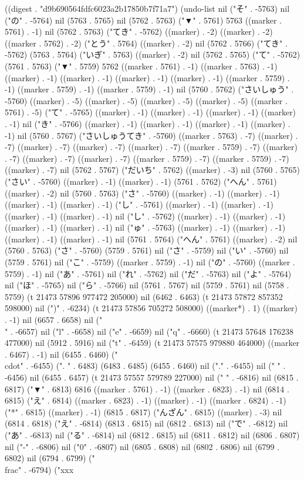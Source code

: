 
((digest . "d9b690564fdfc6023a2b17850b7f71a7") (undo-list nil ("そ" . -5763) nil ("の" . -5764) nil (5763 . 5765) nil (5762 . 5763) ("▼" . 5761) 5763 ((marker . 5761) . -1) nil (5762 . 5763) ("てき" . -5762) ((marker) . -2) ((marker) . -2) ((marker . 5762) . -2) ("とう" . 5764) ((marker) . -2) nil (5762 . 5766) ("てき" . -5762) (5763 . 5764) ("いぎ" . 5763) ((marker) . -2) nil (5762 . 5765) ("て" . -5762) (5761 . 5763) ("▼" . 5759) 5762 ((marker . 5761) . -1) ((marker . 5763) . -1) ((marker) . -1) ((marker) . -1) ((marker) . -1) ((marker) . -1) ((marker . 5759) . -1) ((marker . 5759) . -1) ((marker . 5759) . -1) nil (5760 . 5762) ("さいしゅう" . -5760) ((marker) . -5) ((marker) . -5) ((marker) . -5) ((marker) . -5) ((marker . 5761) . -5) ("て" . -5765) ((marker) . -1) ((marker) . -1) ((marker) . -1) ((marker) . -1) nil ("き" . -5766) ((marker) . -1) ((marker) . -1) ((marker) . -1) ((marker) . -1) nil (5760 . 5767) ("さいしゅうてき" . -5760) ((marker . 5763) . -7) ((marker) . -7) ((marker) . -7) ((marker) . -7) ((marker) . -7) ((marker . 5759) . -7) ((marker) . -7) ((marker) . -7) ((marker) . -7) ((marker . 5759) . -7) ((marker . 5759) . -7) ((marker) . -7) nil (5762 . 5767) ("だいち" . 5762) ((marker) . -3) nil (5760 . 5765) ("さい" . -5760) ((marker) . -1) ((marker) . -1) (5761 . 5762) ("へん" . 5761) ((marker) . -2) nil (5760 . 5763) ("さ" . -5760) ((marker) . -1) ((marker) . -1) ((marker) . -1) ((marker) . -1) ("し" . -5761) ((marker) . -1) ((marker) . -1) ((marker) . -1) ((marker) . -1) nil ("し" . -5762) ((marker) . -1) ((marker) . -1) ((marker) . -1) ((marker) . -1) nil ("ゅ" . -5763) ((marker) . -1) ((marker) . -1) ((marker) . -1) ((marker) . -1) nil (5761 . 5764) ("へん" . 5761) ((marker) . -2) nil (5760 . 5763) ("さ" . -5760) (5759 . 5761) nil ("さ" . -5759) nil ("い" . -5760) nil (5759 . 5761) nil ("こ" . -5759) ((marker . 5759) . -1) nil ("の" . -5760) ((marker . 5759) . -1) nil ("あ" . -5761) nil ("れ" . -5762) nil ("だ" . -5763) nil ("よ" . -5764) nil ("ほ" . -5765) nil ("ら" . -5766) nil (5761 . 5767) nil (5759 . 5761) nil (5758 . 5759) (t 21473 57896 977472 205000) nil (6462 . 6463) (t 21473 57872 857352 598000) nil (")" . -6234) (t 21473 57856 705272 508000) ((marker*) . 1) ((marker) . -1) nil (6657 . 6658) nil ("\\" . -6657) nil ("l" . -6658) nil ("e" . -6659) nil ("q" . -6660) (t 21473 57648 176238 477000) nil (5912 . 5916) nil ("t" . -6459) (t 21473 57575 979880 464000) ((marker . 6467) . -1) nil (6455 . 6460) ("\\cdot" . -6455) (".
" . 6483) (6483 . 6485) (6455 . 6460) nil ("." . -6455) nil (" " . -6456) nil (6455 . 6457) (t 21473 57557 579789 227000) nil (" " . -6816) nil (6815 . 6817) ("▼" . 6813) 6816 ((marker . 5761) . -1) ((marker . 6823) . -1) nil (6814 . 6815) ("え" . 6814) ((marker . 6823) . -1) ((marker) . -1) ((marker . 6824) . -1) ("*" . 6815) ((marker) . -1) (6815 . 6817) ("んざん" . 6815) ((marker) . -3) nil (6814 . 6818) ("え" . -6814) (6813 . 6815) nil (6812 . 6813) nil ("で" . -6812) nil ("あ" . -6813) nil ("る" . -6814) nil (6812 . 6815) nil (6811 . 6812) nil (6806 . 6807) nil ("-" . -6806) nil ("0" . -6807) nil (6805 . 6808) nil (6802 . 6806) nil (6799 . 6802) nil (6794 . 6799) ("\\frac" . -6794) ("xxx
